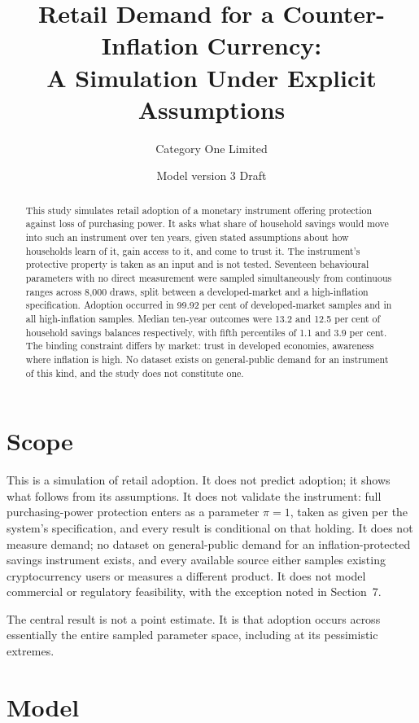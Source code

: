 \documentclass[11pt,a4paper]{article}
\title{\normalsize\bfseries Retail Demand for a Counter-Inflation Currency:\\
A Simulation Under Explicit Assumptions}
\author{\normalsize Category One Limited}
\date{\normalsize Model version 3 \quad\textbullet\quad Draft}
\begin{document}
\maketitle

\begin{abstract}
\noindent\small
This study simulates retail adoption of a monetary instrument offering
protection against loss of purchasing power. It asks what share of household
savings would move into such an instrument over ten years, given stated
assumptions about how households learn of it, gain access to it, and come to
trust it. The instrument's protective property is taken as an input and is
not tested. Seventeen behavioural parameters with no direct measurement were
sampled simultaneously from continuous ranges across 8{,}000 draws, split
between a developed-market and a high-inflation specification. Adoption
occurred in 99.92 per cent of developed-market samples and in all
high-inflation samples. Median ten-year outcomes were 13.2 and 12.5 per cent
of household savings balances respectively, with fifth percentiles of 1.1 and
3.9 per cent. The binding constraint differs by market: trust in developed
economies, awareness where inflation is high. No dataset exists on
general-public demand for an instrument of this kind, and the study does not
constitute one.
\end{abstract}

\section{Scope}

This is a simulation of retail adoption. It does not predict adoption; it
shows what follows from its assumptions. It does not validate the
instrument: full purchasing-power protection enters as a parameter
$\pi = 1$, taken as given per the system's specification, and every result
is conditional on that holding. It does not measure demand; no dataset on
general-public demand for an inflation-protected savings instrument exists,
and every available source either samples existing cryptocurrency users or
measures a different product. It does not model commercial or regulatory
feasibility, with the exception noted in Section~7.

The central result is not a point estimate. It is that adoption occurs
across essentially the entire sampled parameter space, including at its
pessimistic extremes.

\section{Model}
\end{document}
